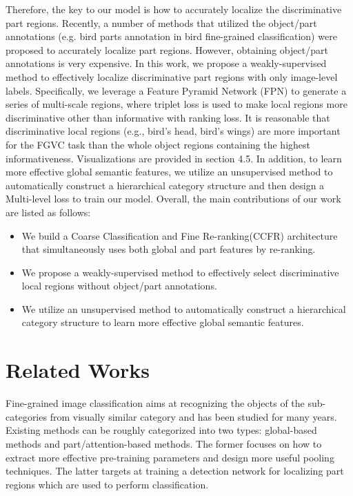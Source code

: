 \documentclass[10pt,twocolumn,letterpaper]{article}
\begin{document}
Therefore, the key to our model is how to accurately localize the discriminative part regions. Recently, a number of methods\cite{Berg2013POOFPO,BransonHBP14,chai2013symbiotic,gavves2013fine,liu2012dog,xie2013hierarchical,ZhangDGD14} that utilized the object/part annotations (e.g. bird parts annotation in bird fine-grained classification) were proposed to accurately localize part regions. However, obtaining object/part annotations is very expensive.
In this work, we propose a weakly-supervised method to effectively localize discriminative part regions with only image-level labels. Specifically, we leverage a Feature Pyramid Network (FPN)\cite{lin2017feature} to generate a series of multi-scale regions, where triplet loss\cite{schroff2015facenet} is used to make local regions more discriminative other than informative with ranking loss\cite{YangLWHGW18}. It is reasonable that discriminative local regions (e.g., bird's head, bird's wings) are more important for the FGVC task than the whole object regions containing the highest informativeness. Visualizations are provided in section 4.5. In addition, to learn more effective global semantic features, we utilize an unsupervised method to automatically construct a hierarchical category structure and then design a Multi-level loss to train our model. 
Overall, the main contributions of our work are listed as follows:
\begin{itemize}
    \item We build a Coarse Classification and Fine Re-ranking(CCFR) architecture that simultaneously uses both global and part features by re-ranking.
    \item We propose a weakly-supervised method to effectively select discriminative local regions without object/part annotations.
    \item We utilize an unsupervised method to automatically construct a hierarchical category structure to learn more effective global semantic features.
\end{itemize}


\section{Related Works}
Fine-grained image classification aims at recognizing the objects of the sub-categories from visually similar category and has been studied for many years. Existing methods can be roughly categorized into two types: global-based methods\cite{li2017dynamic,cui2018large, SimonRDD20} and part/attention-based methods\cite{LinSLJ15,ZhangSGD15,YangLWHGW18,GeLY19,korsch2019classification,du2020fine,abs-2004-02684,ZhuangW020}. The former focuses on how to extract more effective pre-training parameters and design more useful pooling techniques. The latter targets at training a detection network for localizing part regions which are used to perform classification.
\end{document}
